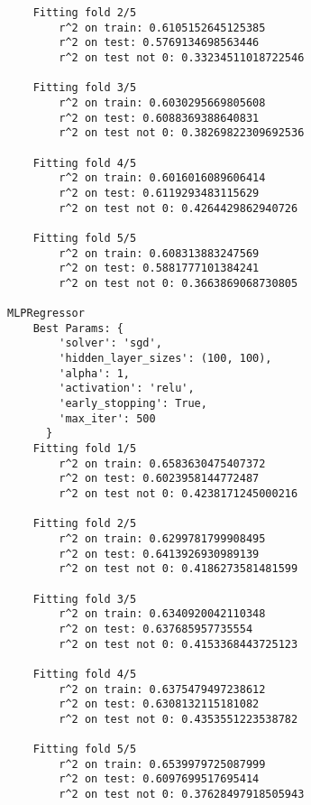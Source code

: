 \begin{Verbatim}
	Fitting fold 2/5
		r^2 on train: 0.6105152645125385
		r^2 on test: 0.5769134698563446
		r^2 on test not 0: 0.33234511018722546

	Fitting fold 3/5
		r^2 on train: 0.6030295669805608
		r^2 on test: 0.6088369388640831
		r^2 on test not 0: 0.38269822309692536

	Fitting fold 4/5
		r^2 on train: 0.6016016089606414
		r^2 on test: 0.6119293483115629
		r^2 on test not 0: 0.4264429862940726

	Fitting fold 5/5
		r^2 on train: 0.608313883247569
		r^2 on test: 0.5881777101384241
		r^2 on test not 0: 0.3663869068730805

MLPRegressor
	Best Params: {
		'solver': 'sgd',
		'hidden_layer_sizes': (100, 100),
		'alpha': 1,
		'activation': 'relu',
		'early_stopping': True,
		'max_iter': 500
	  }
	Fitting fold 1/5
		r^2 on train: 0.6583630475407372
		r^2 on test: 0.6023958144772487
		r^2 on test not 0: 0.4238171245000216

	Fitting fold 2/5
		r^2 on train: 0.6299781799908495
		r^2 on test: 0.6413926930989139
		r^2 on test not 0: 0.4186273581481599

	Fitting fold 3/5
		r^2 on train: 0.6340920042110348
		r^2 on test: 0.637685957735554
		r^2 on test not 0: 0.4153368443725123

	Fitting fold 4/5
		r^2 on train: 0.6375479497238612
		r^2 on test: 0.6308132115181082
		r^2 on test not 0: 0.4353551223538782

	Fitting fold 5/5
		r^2 on train: 0.6539979725087999
		r^2 on test: 0.6097699517695414
		r^2 on test not 0: 0.37628497918505943
\end{Verbatim}

